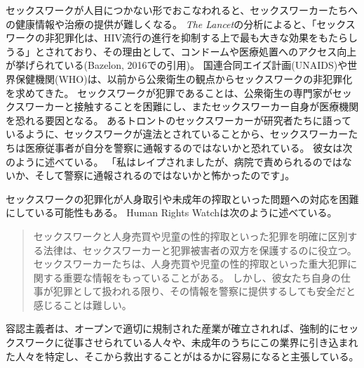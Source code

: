 \documentclass[paper=a4,book,openany]{jlreq}
\begin{document}
セックスワークが人目につかない形でおこなわれると、セックスワーカーたちへの健康情報や治療の提供が難しくなる。
\emph{The Lancet}の分析によると、「セックスワークの非犯罪化は、HIV流行の進行を抑制する上で最も大きな効果をもたらしうる」とされており、その理由として、コンドームや医療処置へのアクセス向上が挙げられている(Bazelon, 2016での引用)。
\nocite{bazelon16:_shoul_prost_be_crime}
国連合同エイズ計画(UNAIDS)や世界保健機関(WHO)は、以前から公衆衛生の観点からセックスワークの非犯罪化を求めてきた。
セックスワークが犯罪であることは、公衆衛生の専門家がセックスワーカーと接触することを困難にし、またセックスワーカー自身が医療機関を恐れる要因となる。
あるトロントのセックスワーカーが研究者たちに語っているように、セックスワークが違法とされていることから、セックスワーカーたちは医療従事者が自分を警察に通報するのではないかと恐れている。
彼女は次のように述べている。
「私はレイプされましたが、病院で責められるのではないか、そして警察に通報されるのではないかと怖かったのです」\citep{neal14:_street_based_sex_worker_needs_asses}。

セックスワークの犯罪化が人身取引や未成年の搾取といった問題への対応を困難にしている可能性もある。
Human Rights Watchは次のように述べている。

\begin{quote}
セックスワークと人身売買や児童の性的搾取といった犯罪を明確に区別する法律は、セックスワーカーと犯罪被害者の双方を保護するのに役立つ。
セックスワーカーたちは、人身売買や児童の性的搾取といった重大犯罪に関する重要な情報をもっていることがある。
しかし、彼女たち自身の仕事が犯罪として扱われる限り、その情報を警察に提供するしても安全だと感じることは難しい。
\citep{watch19:_why_sex_work_shoul_be_decrim}
\end{quote}

容認主義者は、オープンで適切に規制された産業が確立されれば、強制的にセックスワークに従事させられている人々や、未成年のうちにこの業界に引き込まれた人々を特定し、そこから救出することがはるかに容易になると主張している\citep{albright17:_decreas_human_traff_sex_work_decrim}。
\end{document}
